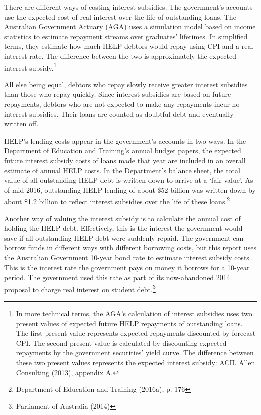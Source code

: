 \documentclass[embargoed]{grattan}
\begin{document}
There are different ways of costing interest subsidies. The government's accounts use the expected cost of real interest over the life of outstanding loans. The Australian Government Actuary (AGA) uses a simulation model based on income statistics to estimate repayment streams over graduates' lifetimes. In simplified terms, they estimate how much HELP debtors would repay using CPI and a real interest rate. The difference between the two is approximately the expected interest subsidy.\footnote{In more technical terms, the AGA's calculation of interest subsidies uses two present values of expected future HELP repayments of outstanding loans. The first present value represents expected repayments discounted by forecast CPI. The second present value is calculated by discounting expected repayments by the government securities' yield curve. The difference between these two present values represents the expected interest subsidy: ACIL Allen Consulting (2013), appendix A.}

All else being equal, debtors who repay slowly receive greater interest subsidies than those who repay quickly. Since interest subsidies are based on future repayments, debtors who are not expected to make any repayments incur no interest subsidies. Their loans are counted as doubtful debt and eventually written off.

HELP's lending costs appear in the government's accounts in two ways. In the Department of Education and Training's annual budget papers, the expected future interest subsidy costs of loans made that year are included in an overall estimate of annual HELP costs. In the Department's balance sheet, the total value of all outstanding HELP debt is written down to arrive at a `fair value'. As of mid-2016, outstanding HELP lending of about \$52 billion was written down by about \$1.2 billion to reflect interest subsidies over the life of these loans.\footnote{Department of Education and Training (2016a), p. 176}

Another way of valuing the interest subsidy is to calculate the annual cost of holding the HELP debt. Effectively, this is the interest the government would save if all outstanding HELP debt were suddenly repaid. The government can borrow funds in different ways with different borrowing costs, but this report uses the Australian Government 10-year bond rate to estimate interest subsidy costs. This is the interest rate the government pays on money it borrows for a 10-year period. The government used this rate as part of its now-abandoned 2014 proposal to charge real interest on student debt.\footnote{Parliament of Australia (2014)}
\end{document}
